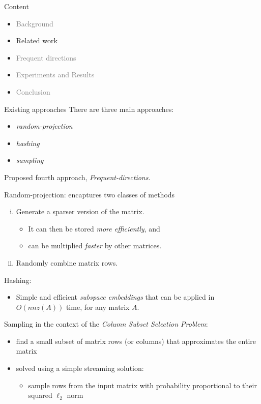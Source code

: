 \documentclass[first=dgreen,second=purple,logo=redque]{aaltoslides}
\begin{document}

\begin{frame}{Content}
\begin{itemize}
\item \textcolor{gray}{Background}
\item Related work
\item \textcolor{gray}{Frequent directions}
\item \textcolor{gray}{Experiments and Results}
\item \textcolor{gray}{Conclusion}
\end{itemize}
\end{frame}


\begin{frame}[allowframebreaks=1]{Existing approaches}
There are three main approaches:
\begin{itemize}
\item \textit{random-projection}
\item \textit{hashing}
\item \textit{sampling}
\end{itemize}

Proposed fourth approach, \textit{Frequent-directions}.

\framebreak

Random-projection: encaptures two classes of methods
\begin{enumerate}[(i)]
  \item Generate a sparser version of the matrix.
   \begin{itemize}
   \item It can then be stored \textit{more efficiently}, and
   \item can be multiplied \textit{faster} by other matrices.
    \end{itemize}
  \item Randomly combine matrix rows.
\end{enumerate}

\framebreak

Hashing:
\begin{itemize}
  \item Simple and efficient \textit{subspace embeddings}
     that can be applied in $O(nnz(A))$ time, for any matrix $A$.
\end{itemize}

\framebreak

Sampling in the context of the \textit{Column Subset Selection Problem}:
\begin{itemize}
  \item find a small subset of matrix rows (or columns) that approximates
  the entire matrix
  \item solved using a simple streaming solution:
   \begin{itemize}
   \item sample rows from the input matrix with probability proportional to
   their squared $\ell_{2}$ norm
   \end{itemize}
\end{itemize}
\end{frame}
\end{document}
